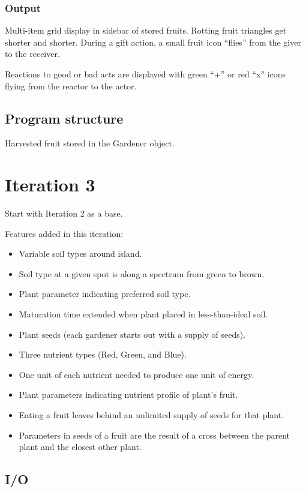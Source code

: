 \documentclass[12pt]{article}
\begin{document}
\subsubsection{Output}
Multi-item grid display in sidebar of stored fruits.  Rotting fruit triangles get shorter and shorter.  During a gift action, a small fruit icon ``flies'' from the giver to the receiver.

Reactions to good or bad acts are displayed with green ``+'' or red ``x'' icons flying from the reactor to the actor.

 

\subsection{Program structure}

Harvested fruit stored in the Gardener object.






\section{Iteration 3}

Start with Iteration 2 as a base.

Features added in this iteration:
\begin{itemize}
\item Variable soil types around island.
\item Soil type at a given spot is along a spectrum from green to brown.
\item Plant parameter indicating preferred soil type.
\item Maturation time extended when plant placed in less-than-ideal soil.
\item Plant seeds (each gardener starts out with a supply of seeds).
\item Three nutrient types (Red, Green, and Blue).
\item One unit of each nutrient needed to produce one unit of energy.
\item Plant parameters indicating nutrient profile of plant's fruit.
\item Eating a fruit leaves behind an unlimited supply of seeds for that plant.
\item Parameters in seeds of a fruit are the result of a cross between the parent plant and the closest other plant.
\end{itemize}

\subsection{I/O}
\end{document}
